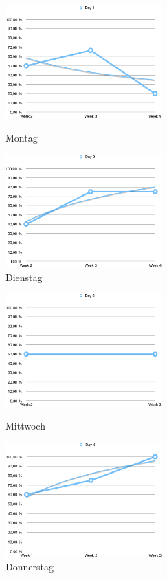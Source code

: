 \begin{figure}[t!]
    \centering
    \parbox{6cm}{
    \includegraphics[width=6cm]{./Abbildungen/Kapitel_04/usr2day1.png}
    \caption{Montag}
    \label{usr2day1}}
    \qquad
    \begin{minipage}{6cm}
    \includegraphics[width=6cm]{./Abbildungen/Kapitel_04/usr2day2.png}
    \caption{Dienstag}
    \label{usr2day2}
    \end{minipage}
\end{figure}


\begin{figure}[t!]
    \centering
    \parbox{6cm}{
    \includegraphics[width=6cm]{./Abbildungen/Kapitel_04/usr2day3.png}
    \caption{Mittwoch}
    \label{usr2day3}}
    \qquad
    \begin{minipage}{6cm}
    \includegraphics[width=6cm]{./Abbildungen/Kapitel_04/usr2day4.png}
    \caption{Donnerstag}
    \label{usr2day4}
    \end{minipage}
\end{figure}

